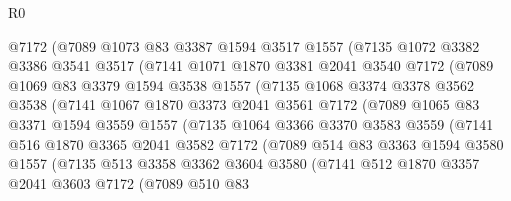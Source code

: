 \begin{lexlean}{R0}
\begin{coremodule}
            @7172
            (@7089
              @1073
              @83
              @3387
              @1594
              @3517
              @1557
              (@7135
                @1072
                @3382
                @3386
                @3541
                @3517
                (@7141
                  @1071
                  @1870
                  @3381
                  @2041
                  @3540
                  @7172
                  (@7089
                    @1069
                    @83
                    @3379
                    @1594
                    @3538
                    @1557
                    (@7135
                      @1068
                      @3374
                      @3378
                      @3562
                      @3538
                      (@7141
                        @1067
                        @1870
                        @3373
                        @2041
                        @3561
                        @7172
                        (@7089
                          @1065
                          @83
                          @3371
                          @1594
                          @3559
                          @1557
                          (@7135
                            @1064
                            @3366
                            @3370
                            @3583
                            @3559
                            (@7141
                              @516
                              @1870
                              @3365
                              @2041
                              @3582
                              @7172
                              (@7089
                                @514
                                @83
                                @3363
                                @1594
                                @3580
                                @1557
                                (@7135
                                  @513
                                  @3358
                                  @3362
                                  @3604
                                  @3580
                                  (@7141
                                    @512
                                    @1870
                                    @3357
                                    @2041
                                    @3603
                                    @7172
                                    (@7089
                                      @510
                                      @83

\end{coremodule}
\end{lexlean}

